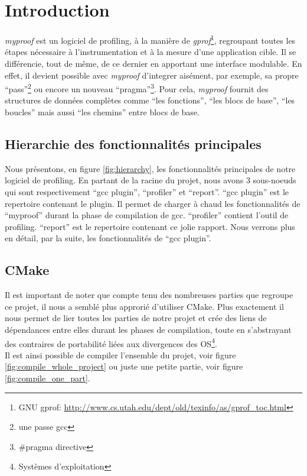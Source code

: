 \section{Introduction}

\emph{myproof} est un logiciel de profiling, à la manière de \emph{gprof}\footnote{GNU gprof: \url{http://www.cs.utah.edu/dept/old/texinfo/as/gprof_toc.html}}, regroupant toutes les étapes nécessaire à l'instrumentation et à la mesure d'une application cible. Il se différencie, tout de même, de ce dernier en apportant une interface modulable. En effet, il devient possible avec \emph{myproof} d'integrer aisément, par exemple, sa propre ``pass''\footnote{une passe gcc} ou encore un nouveau ``pragma''\footnote{\#pragma directive}. Pour cela, \emph{myproof} fournit des structures de données complètes comme ``les fonctions'', ``les blocs de base'', ``les boucles'' mais aussi ``les chemins'' entre blocs de base.

\subsection{Hierarchie des fonctionnalités principales}

Nous présentons, en figure \ref{fig:hierarchy}, les fonctionnalités principales de notre logiciel de profiling. En partant de la racine du projet, nous avons 3 sous-noeuds qui sont respectivement ``gcc plugin'', ``profiler'' et ``report''. ``gcc plugin'' est le repertoire contenant le plugin. Il permet de charger à chaud les fonctionnalités de ``myproof'' durant la phase de compilation de gcc. ``profiler'' contient l'outil de profiling. ``report'' est le repertoire contenant ce jolie rapport. Nous verrons plus en détail, par la suite, les fonctionnalités de ``gcc plugin''.

\subsection{CMake}

Il est important de noter que compte tenu des nombreuses parties que regroupe ce projet, il nous a semblé plus approrié d'utiliser CMake. Plus exactement il nous permet de lier toutes les parties de notre projet et crée des liens de dépendances entre elles durant les phases de compilation, toute en s'abstrayant des contraires de portabilité liées aux divergences des OS\footnote{Systèmes d'exploitation}.\\

Il est ainsi possible de compiler l'ensemble du projet, voir figure \ref{fig:compile_whole_project} ou juste une petite partie, voir figure \ref{fig:compile_one_part}.

